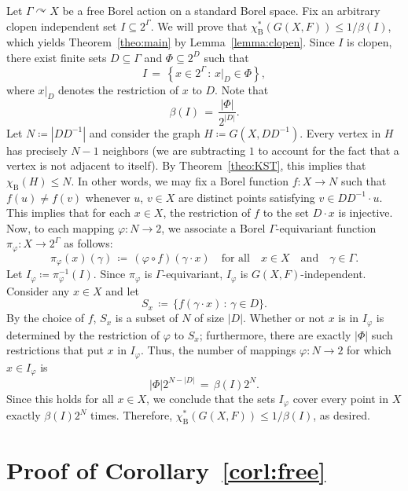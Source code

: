 \documentclass[AHL,Unicode,longabstracts,published]{cedram}
\newcommand{\0}{\varnothing}
\newcommand{\set}[1]{\{#1\}}
\renewcommand{\phi}{\varphi}
\renewcommand{\leq}{\leqslant}
\newcommand{\defeq}{\coloneqq}
\newcommand{\rest}[2]{{{#1}\vert_{#2}}}
\newcommand{\rmB}{\mathrm{B}}
\begin{document}
Let $\Gamma \curvearrowright X$ be a free Borel action on a standard Borel space. Fix an arbitrary clopen independent set $I \subseteq 2^\Gamma$. We will prove that $\chi^\ast_\rmB(G(X,F)) \leq 1/\beta(I)$, which yields Theorem~\ref{theo:main} by Lemma~\ref{lemma:clopen}. Since $I$ is clopen, there exist finite sets $D \subseteq \Gamma$ and $\Phi \subseteq 2^D$ such that
\[
I \,=\, \left\{x \in 2^\Gamma \,:\, \rest{x}{D} \in \Phi\right\},
\]
where $\rest{x}{D}$ denotes the restriction of $x$ to $D$. Note that
\[
\beta(I) \,=\, \frac{|\Phi|}{2^{|D|}}.
\]
Let $N
\defeq |DD^{-1}|$ and consider the graph $H
\defeq G(X, DD^{-1})$. Every vertex in $H$ has precisely $N-1$ neighbors (we are subtracting $1$ to account for the fact that a vertex is not adjacent to itself). By Theorem~\ref{theo:KST}, this implies that $\chi_\rmB(H) \leq N$. In other words, we may fix a Borel function $f \colon X \to N$ such that $f(u) \neq f(v)$ whenever $u$, $v \in X$ are distinct points satisfying $v \in DD^{-1} \cdot u$. This implies that for each $x \in X$, the restriction of $f$ to the set $D \cdot x$ is injective. Now, to each mapping $\phi \colon N \to 2$, we associate a Borel $\Gamma$-equivariant function $\pi_\phi \colon X \to 2^\Gamma$ as follows:
\[
\pi_\phi(x)(\gamma) \,
\defeq\, (\phi \circ f)(\gamma \cdot x) \quad \text{for all}\quad x \in X \quad\text{and}\quad \gamma \in \Gamma.
\]
Let $I_\phi
\defeq \pi_\phi^{-1}(I)$. Since $\pi_\phi$ is $\Gamma$-equivariant, $I_\phi$ is $G(X, F)$-independent. Consider any $x \in X$ and let
\[
S_x \,
\defeq\, \set{f(\gamma \cdot x) \,:\, \gamma \in D}.
\]
By the choice of $f$, $S_x$ is a subset of $N$ of size $|D|$. Whether or not $x$ is in $I_\phi$ is determined by the restriction of $\phi$ to $S_x$; furthermore, there are exactly $|\Phi|$ such restrictions that put $x$ in $I_\phi$. Thus, the number of mappings $\phi \colon N \to 2$ for which $x \in I_\phi$ is
\[
|\Phi|2^{N - |D|} \,=\, \beta(I)2^N.
\]
Since this holds for all $x \in X$, we conclude that the sets $I_\phi$ cover every point in $X$ exactly $\beta(I)2^N$ times. Therefore, $\chi^\ast_\rmB(G(X,F)) \leq 1/\beta(I)$, as desired.

\section{Proof of Corollary~\ref{corl:free}}\label{sec:corl}
\end{document}
